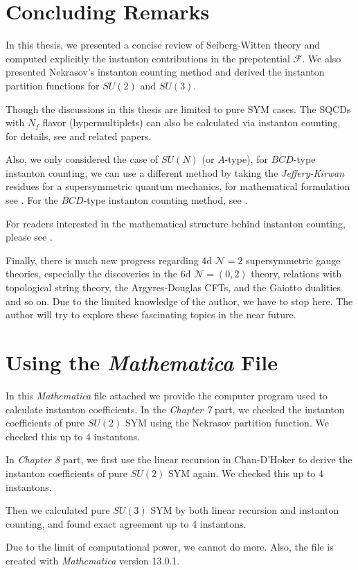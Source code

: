 \documentclass{article}
\begin{document}
\section{Concluding Remarks}
In this thesis, we presented a concise review of Seiberg-Witten theory and computed explicitly the instanton contributions in the prepotential $\mathscr{F}$. We also presented Nekrasov's instanton counting method and derived the instanton partition functions for $SU(2)$ and $SU(3)$.

Though the discussions in this thesis are limited to pure SYM cases. The SQCDs with $N_f$ flavor (hypermultiplets) can also be calculated via instanton counting, for details, see \cite{Moore:1997dj} and related papers.

Also, we only considered the case of $SU(N)$ (or $A$-type), for $BCD$-type instanton counting, we can use a different method by taking the \emph{Jeffery-Kirwan} residues for a supersymmetric quantum mechanics, for mathematical formulation see \cite{Benini:2013nda, Benini:2013xpa}. For the $BCD$-type instanton counting method, see \cite{Nakamura:2015zsa,Nekrasov:2004vw,Kim:2012gu, Nawata:2021dlk}.

For readers interested in the mathematical structure behind instanton counting, please see \cite{Nakajima:2016qkb}. 

Finally, there is much new progress regarding 4d $\mathcal{N}=2$ supersymmetric gauge theories, especially the discoveries in the 6d $\mathcal{N}=(0,2)$ theory, relations with topological string theory, the Argyres-Douglas CFTs, and the Gaiotto dualities and so on. Due to the limited knowledge of the author, we have to stop here. The author will try to explore these fascinating topics in the near future.

\appendix
\section{Using the \textit{Mathematica} File}
In this \textit{Mathematica} file attached we provide the computer program used to calculate instanton coefficients. In the \textit{Chapter 7} part, we checked the instanton coefficients of pure $SU(2)$ SYM using the Nekrasov partition function. We checked this up to 4 instantons.

In \textit{Chapter 8} part, we first use the linear recursion in Chan-D'Hoker \cite{Chan:1999gj} to derive the instanton coefficients of pure $SU(2)$ SYM again. We checked this up to 4 instantons. 

Then we calculated pure $SU(3)$ SYM by both linear recursion and instanton counting, and found exact agreement up to 4 instantons.

Due to the limit of computational power, we cannot do more. Also, the file is created with \textit{Mathematica} version 13.0.1.



\end{document}
